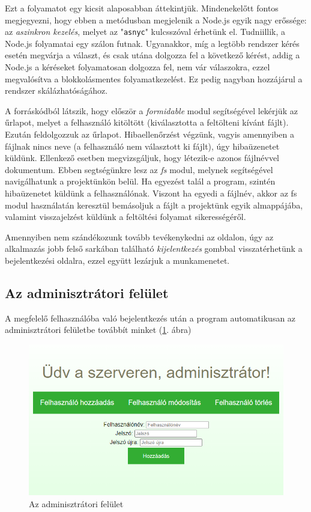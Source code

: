 Ezt a folyamatot egy kicsit alaposabban áttekintjük. Mindenekelőtt fontos megjegyezni, hogy ebben a metódusban megjelenik a Node.js egyik nagy erőssége: az \textit{aszinkron kezelés}, melyet az "\texttt{asnyc}" kulcsszóval érhetünk el. Tudniillik, a Node.js folyamatai egy szálon futnak. Ugyanakkor, míg a legtöbb rendszer kérés esetén megvárja a választ, és csak utána dolgozza fel a következő kérést, addig a Node.js a kéréseket folyamatosan dolgozza fel, nem vár válaszokra, ezzel megvalósítva a blokkolásmentes folyamatkezelést. Ez pedig nagyban hozzájárul a rendszer skálázhatóságához.

A forráskódból látszik, hogy először a \textit{formidable} modul segítségével lekérjük az űrlapot, melyet a felhasználó kitöltött (kiválasztotta a feltölteni kívánt fájlt). Ezután feldolgozzuk az űrlapot. Hibaellenőrzést végzünk, vagyis amennyiben a fájlnak nincs neve (a felhasználó nem választott ki fájlt), úgy hibaüzenetet küldünk. Ellenkező esetben megvizsgáljuk, hogy létezik-e azonos fájlnévvel dokumentum. Ebben segtségünkre lesz az \textit{fs} modul, melynek segítségével navigálhatunk a projektünkön belül. Ha egyezést talál a program, szintén hibaüzenetet küldünk a felhasználónak. Viszont ha egyedi a fájlnév, akkor az fs modul használatán keresztül bemásoljuk a fájlt a projektünk egyik almappájába, valamint visszajelzést küldünk a feltöltési folyamat sikerességéről.

Amennyiben nem szándékozunk tovább tevékenykedni az oldalon, úgy az alkalmazás jobb felső sarkában található \textit{kijelentkezés} gombbal visszatérhetünk a bejelentkezési oldalra, ezzel együtt lezárjuk a munkamenetet.

\subsection{Az adminisztrátori felület}

A megfelelő felhasználóba való bejelentkezés után a program automatikusan az adminisztrátori felületbe továbbít minket (\ref{fig:admin}. ábra)

\begin{figure}[h]
	\centering
		\includegraphics[width=12truecm, height=7truecm]{images/admin_oldal.png}
	\caption{Az adminisztrátori felület}
	\label{fig:admin}
\end{figure}

